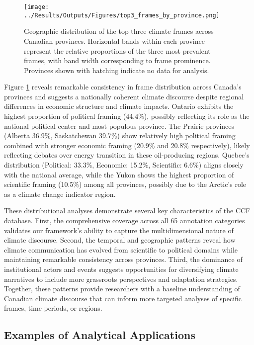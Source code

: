 \documentclass[12pt]{article}
\begin{document}
\begin{figure}[b!]
\centering
\texttt{[image: ../Results/Outputs/Figures/top3\_frames\_by\_province.png]}
\caption{Geographic distribution of the top three climate frames across Canadian provinces. Horizontal bands within each province represent the relative proportions of the three most prevalent frames, with band width corresponding to frame prominence. Provinces shown with hatching indicate no data for analysis.}
\label{fig:provincial_frames}
\end{figure}

Figure \ref{fig:provincial_frames} reveals remarkable consistency in frame distribution across Canada's provinces and suggests a nationally coherent climate discourse despite regional differences in economic structure and climate impacts. Ontario exhibits the highest proportion of political framing (44.4\%), possibly reflecting its role as the national political center and most populous province. The Prairie provinces (Alberta 36.9\%, Saskatchewan 39.7\%) show relatively high political framing combined with stronger economic framing (20.9\% and 20.8\% respectively), likely reflecting debates over energy transition in these oil-producing regions. Quebec's distribution (Political: 33.3\%, Economic: 15.2\%, Scientific: 6.6\%) aligns closely with the national average, while the Yukon shows the highest proportion of scientific framing (10.5\%) among all provinces, possibly due to the Arctic's role as a climate change indicator region. 

These distributional analyses demonstrate several key characteristics of the CCF database. First, the comprehensive coverage across all 65 annotation categories validates our framework's ability to capture the multidimensional nature of climate discourse. Second, the temporal and geographic patterns reveal how climate communication has evolved from scientific to political domains while maintaining remarkable consistency across provinces. Third, the dominance of institutional actors and events suggests opportunities for diversifying climate narratives to include more grassroots perspectives and adaptation strategies. Together, these patterns provide researchers with a baseline understanding of Canadian climate discourse that can inform more targeted analyses of specific frames, time periods, or regions.

\subsection{Examples of Analytical Applications}
\end{document}
